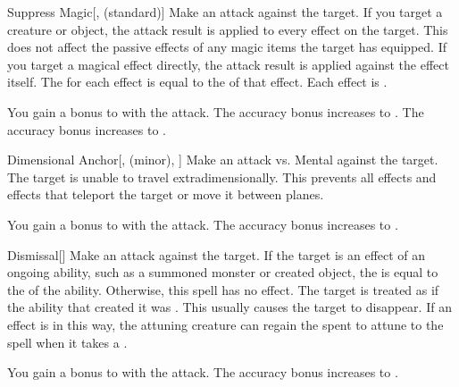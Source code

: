 \lowercase{\hypertarget{spell:Suppress Magic}{}}\label{spell:Suppress Magic}
\begin{freeability}[Rank 1]{\hypertarget{spell:Suppress Magic}{Suppress Magic}}[,  (standard)]
Make an attack against the target.
If you target a creature or object, the attack result is applied to every  effect on the target.
This does not affect the passive effects of any magic items the target has equipped.
If you target a magical effect directly, the attack result is applied against the effect itself.
The  for each effect is equal to the  of that effect.
\hit Each effect is .

\rankline
{} You gain a  bonus to  with the attack.
 The accuracy bonus increases to .
 The accuracy bonus increases to .
\end{freeability}
\vspace{0.25em}



\lowercase{\hypertarget{spell:Dimensional Anchor}{}}\label{spell:Dimensional Anchor}
\begin{freeability}[Rank 3]{\hypertarget{spell:Dimensional Anchor}{Dimensional Anchor}}[,  (minor), ]
Make an attack vs. Mental against the target.
\hit The target is unable to travel extradimensionally.
This prevents all  effects and effects that teleport the target or move it between planes.

\rankline
{} You gain a  bonus to  with the attack.
 The accuracy bonus increases to .
\end{freeability}
\vspace{0.25em}



\lowercase{\hypertarget{spell:Dismissal}{}}\label{spell:Dismissal}
\begin{freeability}[Rank 3]{\hypertarget{spell:Dismissal}{Dismissal}}[]
Make an attack against the target.
If the target is an effect of an ongoing  ability, such as a summoned monster or created object, the  is equal to the  of the ability.
Otherwise, this spell has no effect.
\hit The target is treated as if the ability that created it was .
This usually causes the target to disappear.
If an  effect is  in this way,
the attuning creature can regain the  spent to attune to the spell when it takes a .

\rankline
{} You gain a  bonus to  with the attack.
 The accuracy bonus increases to .
\end{freeability}
\vspace{0.25em}



